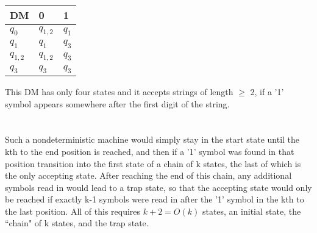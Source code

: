 \documentclass{article}
\begin{document}
\section{}

\begin{tabular}{l | l l}
DM & 0 & 1 \\
\hline
$q_0$ & $q_{1,2}$ & $q_1$ \\
$q_1$ & $q_1$ & $q_3$ \\
$q_{1,2}$ & $q_{1,2}$ & $q_3$ \\ 
$q_3$ & $q_3$ & $q_3$ \\
\end{tabular}

This DM has only four states and it accepts strings of length $\ge$ 2, if a '1'
symbol appears somewhere after the first digit of the string.

\section{}
Such a nondeterministic machine would simply stay in the start state until
the kth to the end position is reached, and then if a '1' symbol was found in
that position transition into the first state of a chain of k states, the last
of which is the only accepting state. After reaching the end of this chain, any
additional symbols read in would lead to a trap state, so that the accepting
state would only be reached if exactly k-1 symbols were read in after the '1'
symbol in the kth to the last position. All of this requires $k+2 = O(k)$
states, an initial state, the ``chain" of k states, and the trap state.
\end{document}
